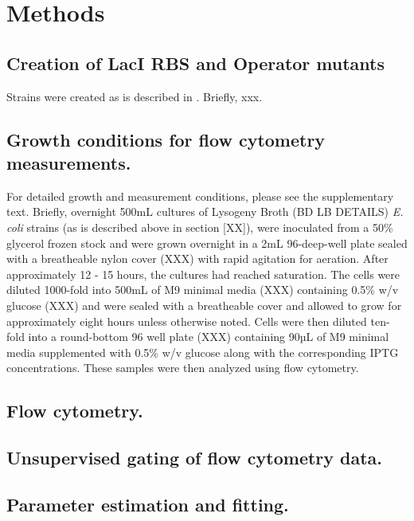 \pagebreak
\section*{Methods }

\subsection{Creation of LacI RBS and Operator mutants}
Strains were created as is described in \citep{Garcia2011}. Briefly, xxx.

\subsection{Growth conditions for flow cytometry measurements.}
For detailed growth and measurement conditions, please see the supplementary
text. Briefly, overnight 500mL cultures of Lysogeny Broth (BD LB DETAILS)
\textit{E. coli} strains (as is described above in section [XX]), were
inoculated from a 50\% glycerol frozen stock and were grown overnight in a 2mL
96-deep-well plate sealed with a breatheable nylon cover (XXX) with rapid
agitation for aeration. After approximately 12 - 15 hours, the cultures had
reached saturation. The cells were diluted 1000-fold into 500mL of M9 minimal
media (XXX) containing 0.5\% w/v glucose (XXX) and were sealed with a
breatheable cover and allowed to grow for approximately eight hours unless
otherwise noted. Cells were then diluted ten-fold into a round-bottom 96 well
plate (XXX) containing 90µL of M9 minimal media supplemented with 0.5\% w/v
glucose along with the corresponding IPTG concentrations. These samples were
then analyzed using flow cytometry.

\subsection{Flow cytometry.}

\subsection{Unsupervised gating of flow cytometry data.}

\subsection{Parameter estimation and fitting.}

